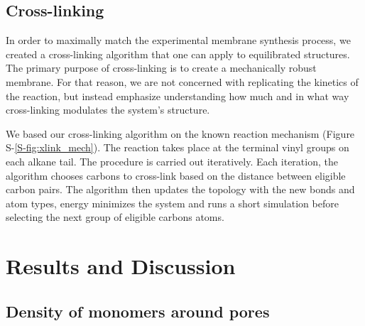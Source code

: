 \documentclass[journal=jpcbfk,manuscript=article]{achemso}
\begin{document}
  \subsection{Cross-linking}
  
  In order to maximally match the experimental membrane synthesis process,
  we created a cross-linking algorithm that one can apply to equilibrated structures. 
  The primary purpose of cross-linking is to create a mechanically robust membrane.
  For that reason, we are not concerned with replicating the kinetics of the reaction, 
  but instead emphasize understanding how much and in what way cross-linking modulates
  the system's structure.

  We based our cross-linking algorithm on the known reaction mechanism 
  (Figure S-\ref{S-fig:xlink_mech}). The reaction takes place at the terminal vinyl groups
  on each alkane tail. The procedure is carried out iteratively. Each iteration, the
  algorithm chooses carbons to cross-link based on the distance between eligible 
  carbon pairs. The algorithm then updates the topology with the new bonds and atom
  types, energy minimizes the system and runs a short simulation before selecting 
  the next group of eligible carbons atoms.

  \section{Results and Discussion}
  
  \subsection{Density of monomers around pores}
\end{document}

